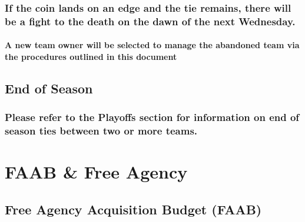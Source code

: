 \documentclass[
]{book}
\begin{document}
\hypertarget{if-the-coin-lands-on-an-edge-and-the-tie-remains-there-will-be-a-fight-to-the-death-on-the-dawn-of-the-next-wednesday.}{%
\subsection{If the coin lands on an edge and the tie remains, there will be a fight to the death on the dawn of the next Wednesday.}\label{if-the-coin-lands-on-an-edge-and-the-tie-remains-there-will-be-a-fight-to-the-death-on-the-dawn-of-the-next-wednesday.}}

\hypertarget{a-new-team-owner-will-be-selected-to-manage-the-abandoned-team-via-the-procedures-outlined-in-this-document}{%
\subsubsection{A new team owner will be selected to manage the abandoned team via the procedures outlined in this document}\label{a-new-team-owner-will-be-selected-to-manage-the-abandoned-team-via-the-procedures-outlined-in-this-document}}

\hypertarget{end-of-season}{%
\section{End of Season}\label{end-of-season}}

\hypertarget{please-refer-to-the-playoffs-section-for-information-on-end-of-season-ties-between-two-or-more-teams.}{%
\subsection{Please refer to the Playoffs section for information on end of season ties between two or more teams.}\label{please-refer-to-the-playoffs-section-for-information-on-end-of-season-ties-between-two-or-more-teams.}}

\hypertarget{free-agency}{%
\chapter{FAAB \& Free Agency}\label{free-agency}}

\hypertarget{free-agency-acquisition-budget-faab}{%
\section{Free Agency Acquisition Budget (FAAB)}\label{free-agency-acquisition-budget-faab}}
\end{document}
